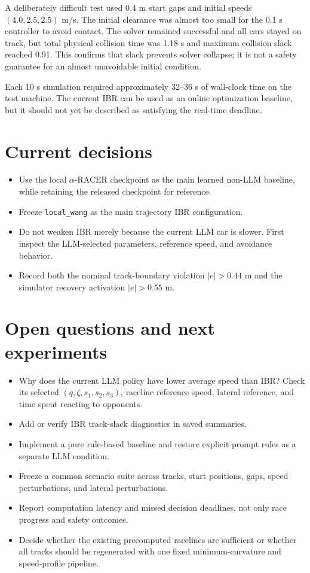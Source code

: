\documentclass[11pt]{article}
\newcommand{\code}[1]{\texttt{#1}}
\begin{document}
A deliberately difficult test used 0.4 m start gaps and initial speeds
$(4.0,2.5,2.5)$ m/s. The initial clearance was almost too small for the 0.1 s
controller to avoid contact. The solver remained successful and all cars stayed
on track, but total physical collision time was 1.18 s and maximum collision
slack reached 0.91. This confirms that slack prevents solver collapse; it is not
a safety guarantee for an almost unavoidable initial condition.

Each 10 s simulation required approximately 32--36 s of wall-clock time on the
test machine. The current IBR can be used as an online optimization baseline,
but it should not yet be described as satisfying the real-time deadline.

\section{Current decisions}

\begin{itemize}
  \item Use the local $\alpha$-RACER checkpoint as the main learned
  non-LLM baseline, while retaining the released checkpoint for reference.
  \item Freeze \code{local\_wang} as the main trajectory IBR configuration.
  \item Do not weaken IBR merely because the current LLM car is slower. First
  inspect the LLM-selected parameters, reference speed, and avoidance behavior.
  \item Record both the nominal track-boundary violation $|e|>0.44$ m and the
  simulator recovery activation $|e|>0.55$ m.
\end{itemize}

\section{Open questions and next experiments}

\begin{itemize}
  \item Why does the current LLM policy have lower average speed than IBR?
  Check its selected $(q,\zeta,s_1,s_2,s_3)$, raceline reference speed, lateral
  reference, and time spent reacting to opponents.
  \item Add or verify IBR track-slack diagnostics in saved summaries.
  \item Implement a pure rule-based baseline and restore explicit prompt rules
  as a separate LLM condition.
  \item Freeze a common scenario suite across tracks, start positions, gaps,
  speed perturbations, and lateral perturbations.
  \item Report computation latency and missed decision deadlines, not only race
  progress and safety outcomes.
  \item Decide whether the existing precomputed racelines are sufficient or
  whether all tracks should be regenerated with one fixed minimum-curvature and
  speed-profile pipeline.
\end{itemize}
\end{document}
